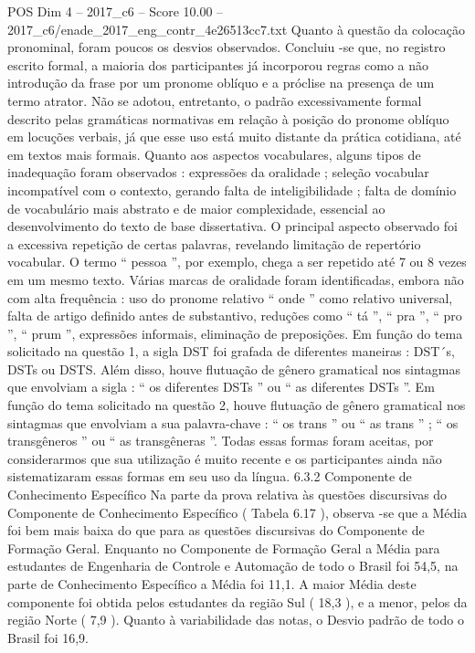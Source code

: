 \begin{textsample}{POS Dim 4 – 2017\_c6 – Score 10.00 – 2017\_c6/enade\_2017\_eng\_contr\_4e26513cc7.txt}
Quanto à questão da colocação pronominal, foram poucos os desvios observados.
Concluiu -se que, no registro escrito formal, a maioria dos participantes já incorporou regras como a não introdução da frase por um pronome oblíquo e a próclise na presença de um termo atrator.
Não se adotou, entretanto, o padrão excessivamente formal descrito pelas gramáticas normativas em relação à posição do pronome oblíquo em locuções verbais, já que esse uso está muito distante da prática cotidiana, até em textos mais formais.
Quanto aos aspectos vocabulares, alguns tipos de inadequação foram observados : expressões da oralidade ; seleção vocabular incompatível com o contexto, gerando falta de inteligibilidade ; falta de domínio de vocabulário mais abstrato e de maior complexidade, essencial ao desenvolvimento do texto de base dissertativa.
O principal aspecto observado foi a excessiva repetição de certas palavras, revelando limitação de repertório vocabular.
O termo “ pessoa ”, por exemplo, chega a ser repetido até 7 ou 8 vezes em um mesmo texto.
Várias marcas de oralidade foram identificadas, embora não com alta frequência : uso do pronome relativo “ onde ” como relativo universal, falta de artigo definido antes de substantivo, reduções como “ tá ”, “ pra ”, “ pro ”, “ prum ”, expressões informais, eliminação de preposições.
Em função do tema solicitado na questão 1, a sigla DST foi grafada de diferentes maneiras : DST´s, DSTs ou DSTS.
Além disso, houve flutuação de gênero gramatical nos sintagmas que envolviam a sigla : “ os diferentes DSTs ” ou “ as diferentes DSTs ”.
Em função do tema solicitado na questão 2, houve flutuação de gênero gramatical nos sintagmas que envolviam a sua palavra-chave : “ os trans ” ou “ as trans ” ; “ os transgêneros ” ou “ as transgêneras ”.
Todas essas formas foram aceitas, por considerarmos que sua utilização é muito recente e os participantes ainda não sistematizaram essas formas em seu uso da língua. 6.3.2 Componente de Conhecimento Específico Na parte da prova relativa às questões discursivas do Componente de Conhecimento Específico ( Tabela 6.17 ), observa -se que a Média foi bem mais baixa do que para as questões discursivas do Componente de Formação Geral.
Enquanto no Componente de Formação Geral a Média para estudantes de Engenharia de Controle e Automação de todo o Brasil foi 54,5, na parte de Conhecimento Específico a Média foi 11,1.
A maior Média deste componente foi obtida pelos estudantes da região Sul ( 18,3 ), e a menor, pelos da região Norte ( 7,9 ).
Quanto à variabilidade das notas, o Desvio padrão de todo o Brasil foi 16,9.

\end{textsample}
